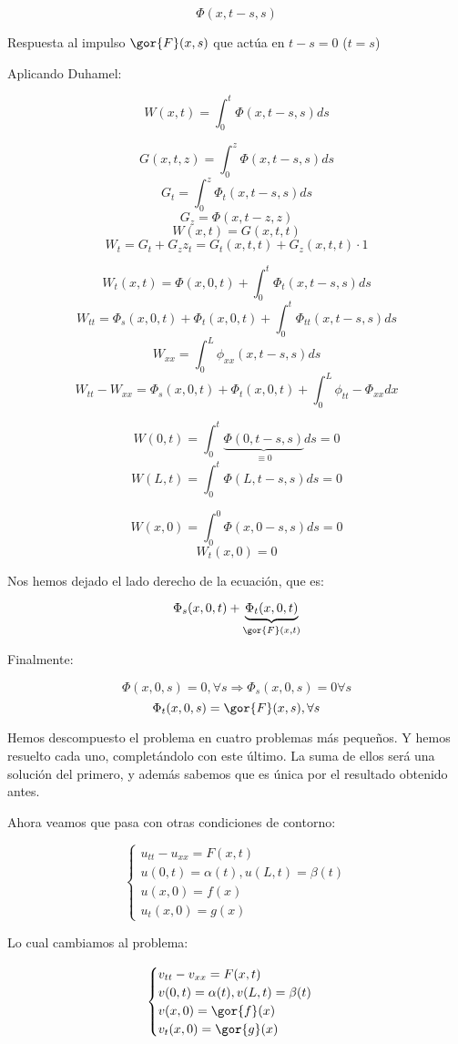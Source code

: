 			\[ \Phi(x,t-s,s)\]

			Respuesta al impulso $\gor{F} (x,s)$ que actúa en $t-s = 0$ ($t=s$)

			Aplicando Duhamel:

			\[ W(x,t) = \int_0^t \Phi(x,t-s,s) ds \]

			\[ G(x,t,z) = \int_0^z \Phi(x,t-s,s) ds\]
			\[ G_t = \int_0^z \Phi_t (x,t-s,s) ds \]
			\[ G_z = \Phi(x,t-z,z) \]
			\[ W(x,t) = G(x,t,t)\]
			\[ W_t = G_t + G_z z_t = G_t(x,t,t) + G_z (x,t,t) \cdot 1\]

			\[ W_t(x,t) = \Phi(x,0,t)+ \int_0^t \Phi_t (x,t-s,s) ds\]
			\[ W_{tt} = \Phi_{s} (x,0,t) + \Phi_t(x,0,t) + \int_0^t \Phi_{tt} (x,t-s,s) ds  \]
			\[ W_{xx} = \int_0^L \phi_{xx} (x,t-s,s) ds \]
			\[ W_{tt} - W_{xx} = \Phi_{s}(x,0,t) + \Phi_t(x,0,t) + \int_0^L \phi_{tt} - \Phi_{xx} dx \]

			\[ W(0,t) = \int_0^t \underbrace{\Phi(0,t-s,s)}_{\equiv 0} ds = 0  \]
			\[ W(L,t) = \int_0^t \Phi(L,t-s,s) ds = 0 \]

			\[ W(x,0) = \int_0^0 \Phi(x,0-s,s) ds = 0 \]
			\[ W_t (x,0) = 0\]

			Nos hemos dejado el lado derecho de la ecuación, que es:

			\[\Phi_s (x,0,t) + \underbrace{\Phi_t(x,0,t)}_{\gor{F}(x,t)} \]

			Finalmente:

			\[ \Phi(x,0,s) = 0, \forall s \Rightarrow \Phi_s (x,0,s) = 0 \forall s  \]
			\[ \Phi_t(x,0,s) = \gor{F}(x,s), \forall s \]

			Hemos descompuesto el problema en cuatro problemas más pequeños. Y hemos resuelto cada uno, completándolo con este último. La suma de ellos será una solución del primero, y además sabemos que es única por el resultado obtenido antes.

			Ahora veamos que pasa con otras condiciones de contorno:

			\[ \begin{cases}
		 		u_{tt} - u_{xx} = F(x,t)\\
		 		u(0,t) = \alpha(t), u(L,t) = \beta(t) \\
		 		u(x,0) = f(x) \\
		 		u_t(x,0) = g(x)
		 	\end{cases}\]

		 	Lo cual cambiamos al problema:

		 	\[ \begin{cases}
		 		v_{tt} - v_{xx} = F(x,t)\\
		 		v(0,t) = \alpha(t), v(L,t) = \beta(t) \\
		 		v(x,0) = \gor{f}(x) \\
		 		v_t(x,0) = \gor{g}(x)
		 	\end{cases}\]

